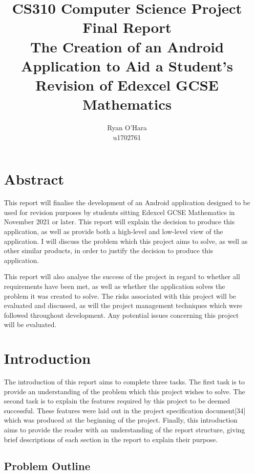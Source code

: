\documentclass{article}
\title{CS310 Computer Science Project \\ Final Report \\ The Creation of an Android Application to Aid a Student's Revision of Edexcel GCSE Mathematics}
\author{Ryan O'Hara \\ u1702761}
\begin{document}
\maketitle

\newpage

\tableofcontents

\newpage

\section{Abstract}
\label{section:abstract}

This report will finalise the development of an Android application designed to be used for revision purposes by students sitting Edexcel GCSE Mathematics in November 2021 or later. This report will explain the decision to produce this application, as well as provide both a high-level and low-level view of the application. I will discuss the problem which this project aims to solve, as well as other similar products, in order to justify the decision to produce this application. \par

This report will also analyse the success of the project in regard to whether all requirements have been met, as well as whether the application solves the problem it was created to solve. The risks associated with this project will be evaluated and discussed, as will the project management techniques which were followed throughout development. Any potential issues concerning this project will be evaluated. \par

\section{Introduction}
\label{section:introduction}

The introduction of this report aims to complete three tasks. The first task is to provide an understanding of the problem which this project wishes to solve. The second task is to explain the features required by this project to be deemed successful. These features were laid out in the project specification document[34] which was produced at the beginning of the project. Finally, this introduction aims to provide the reader with an understanding of the report structure, giving brief descriptions of each section in the report to explain their purpose.

\subsection{Problem Outline}
\end{document}
